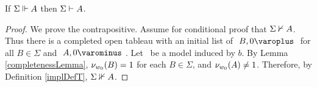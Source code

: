 \begin{thm}\label{completenessTheorem}
If $ { \Sigma }\Vdash{ A } $ then $ { \Sigma }\vdash{ A } $.
\end{thm}

\begin{proof}
We prove the contrapositive. 
	Assume for conditional proof that $ { \Sigma }\nvdash{ A } $. 
	Thus there is a completed open tableau with an initial list of $ \like{ \dNode{ B }{ 0 }} $ for all $ B \in \Sigma $ and $ \like{ \uNode{ A }{ 0 }} $. 
	Let \Model\ be a model induced by $ b $.
	By Lemma \ref{completenessLemma}, $ \mathcal{\nu}_{ w_0 }({ B }) = 1 $ for each $ B \in \Sigma $, and 
	$ \mathcal{\nu}_{ w_0 }({ A }) \neq 1 $. Therefore, by Definition \ref{implDefT}, $ { \Sigma }\nVdash{ A } $.
\end{proof}

%
%

%